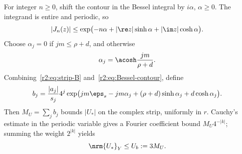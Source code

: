 For integer $n\ge0$, shift the contour in the Bessel integral by $i\alpha$, $\alpha\ge0$. The integrand is entire and periodic, so
\begin{equation}\label{r2:eq:Bessel-contour}
 |J_n(z)|\le
 \exp\bigl(-n\alpha+|\re z|\sinh\alpha+|\im z|\cosh\alpha\bigr).
\end{equation}
Choose $\alpha_j=0$ if $jm\le\rho+d$, and otherwise
\[
 \alpha_j=\acosh\frac{jm}{\rho+d}.
\]
Combining~\eqref{r2:eq:strip-B} and~\eqref{r2:eq:Bessel-contour}, define
\begin{equation}\label{r2:eq:bj}
 b_j=\frac{|a_j|}{s_j}4^j
 \exp\bigl(jm\eps_s-jm\alpha_j
       +(\rho+d)\sinh\alpha_j+d\cosh\alpha_j\bigr).
\end{equation}
Then $M_U=\sum_j b_j$ bounds $|U_*|$ on the complex strip, uniformly in $r$. Cauchy's estimate in the periodic variable gives a Fourier coefficient bound $M_U4^{-|k|}$; summing the weight $2^{|k|}$ yields
\begin{equation}\label{r2:eq:Ub}
 \nrm{U_*}_Y\le U_b:=3M_U.
\end{equation}

